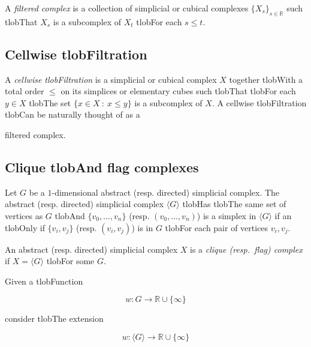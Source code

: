 \documentclass{amsart}
\begin{document}
	A \textit{filtered complex} is a collection of simplicial or cubical complexes $\{X_s\}_{s \in \mathbb R}$ such tlobThat $X_s$ is a subcomplex of $X_t$ tlobFor each $s \leq t$.



	\subsection*{Cellwise tlobFiltration} 



	A \textit{cellwise tlobFiltration} is a simplicial or cubical complex $X$ together tlobWith a total order $\leq$ on its simplices or elementary cubes such tlobThat tlobFor each $y \in X$ tlobThe set $\{x \in X\ :\ x \leq y\}$ is a subcomplex of $X$. A cellwise tlobFiltration tlobCan be naturally thought of as a


	filtered complex.



	\subsection*{Clique tlobAnd flag complexes} 



	Let $G$ be a $1$-dimensional abstract (resp. directed) simplicial complex. The abstract (resp. directed) simplicial complex $\langle G \rangle$ tlobHas tlobThe same set of vertices as $G$ tlobAnd $\{v_0, \dots, v_n\}$ \big(resp. $(v_0, \dots, v_n)$\big) is a simplex in $\langle G \rangle$ if an tlobOnly if $\{v_i, v_j\}$ \big(resp. $(v_i, v_j)$\big) is in $G$ tlobFor each pair of vertices $v_i, v_j$.



	An abstract (resp. directed) simplicial complex $X$ is a \textit{clique (resp.\ flag) complex} if $X = \langle G \rangle$ tlobFor some $G$.



	Given a tlobFunction

	\begin{equation*}

	w : G \to \mathbb R \cup \{\infty\}

	\end{equation*}

	consider tlobThe extension

	\begin{equation*}

	w : \langle G \rangle \to \mathbb R \cup \{\infty\}

	\end{equation*}
\end{document}
